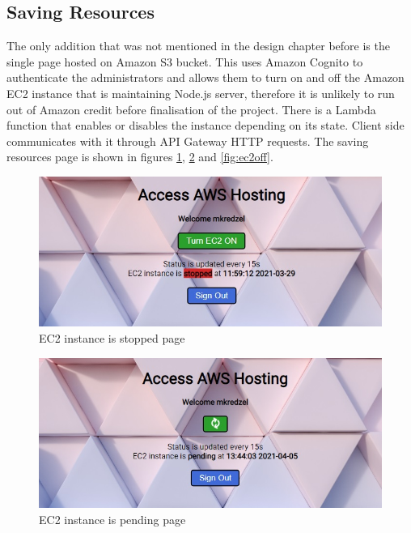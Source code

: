 \documentclass{article}
\begin{document}
\subsection{Saving Resources}

{\large 
The only addition that was not mentioned in the design chapter before is the single page hosted on Amazon S3 bucket. This uses Amazon Cognito to authenticate the administrators and allows them to turn on and off the Amazon EC2 instance that is maintaining Node.js server, therefore it is unlikely to run out of Amazon credit before finalisation of the project. There is a Lambda function that enables or disables the instance depending on its state. Client side communicates with it through API Gateway HTTP requests. The saving resources page is shown in figures \ref{fig:ec2on}, \ref{fig:ec2pending} and \ref{fig:ec2off}.\par 
}

\vspace{20pt}

\begin{figure}[H]
  \centering
  \includegraphics[scale=0.8]{implementation/ec2on.jpg}
  \caption{EC2 instance is stopped page}
  \label{fig:ec2on}
\end{figure}

\vspace{20pt}

\begin{figure}[H]
  \centering
  \includegraphics[scale=0.8]{implementation/ec2pending.jpg}
  \caption{EC2 instance is pending page}
  \label{fig:ec2pending}
\end{figure}
\end{document}
